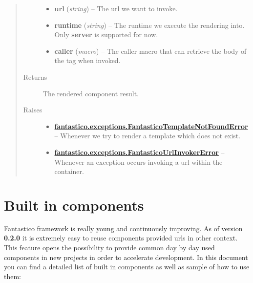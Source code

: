 \documentclass[letterpaper,10pt,english]{sphinxmanual}
\begin{document}
\begin{fulllineitems}
\begin{fulllineitems}
\begin{quote}
\begin{description}
\begin{itemize}
\item {} 
\textbf{url} (\emph{string}) -- The url we want to invoke.

\item {} 
\textbf{runtime} (\emph{string}) -- The runtime we execute the rendering into. Only \textbf{server} is supported for now.

\item {} 
\textbf{caller} (\emph{macro}) -- The caller macro that can retrieve the body of the tag when invoked.

\end{itemize}

\item[{Returns}] \leavevmode
The rendered component result.

\item[{Raises}] \leavevmode\begin{itemize}
\item {} 
{\hyperref[features/exceptions:fantastico.exceptions.FantasticoTemplateNotFoundError]{\textbf{fantastico.exceptions.FantasticoTemplateNotFoundError}}} -- Whenever we try to render a template which does not exist.

\item {} 
{\hyperref[features/exceptions:fantastico.exceptions.FantasticoUrlInvokerError]{\textbf{fantastico.exceptions.FantasticoUrlInvokerError}}} -- Whenever an exception occurs invoking a url within the container.

\end{itemize}

\end{description}\end{quote}

\end{fulllineitems}


\end{fulllineitems}



\section{Built in components}
\label{features/components_builtin::doc}\label{features/components_builtin:built-in-components}
Fantastico framework is really young and continuously improving. As of version \textbf{0.2.0} it is extremely easy to reuse components
provided urls in other context. This feature opens the possibility to provide common day by day used components in
new projects in order to accelerate development. In this document you can find a detailed list of built in components
as well as sample of how to use them:
\end{document}
